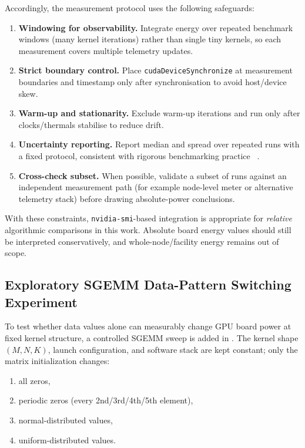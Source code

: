 Accordingly, the measurement protocol uses the following safeguards:
\begin{enumerate}
  \item \textbf{Windowing for observability.} Integrate energy over repeated
  benchmark windows (many kernel iterations) rather than single tiny kernels,
  so each measurement covers multiple telemetry updates.
  \item \textbf{Strict boundary control.} Place \texttt{cudaDeviceSynchronize}
  at measurement boundaries and timestamp only after synchronisation to avoid
  host/device skew.
  \item \textbf{Warm-up and stationarity.} Exclude warm-up iterations and run
  only after clocks/thermals stabilise to reduce drift.
  \item \textbf{Uncertainty reporting.} Report median and spread over repeated
  runs with a fixed protocol, consistent with rigorous benchmarking practice
  ~\cite{kalibera2013rigorous}.
  \item \textbf{Cross-check subset.} When possible, validate a subset of runs
  against an independent measurement path (for example node-level meter or
  alternative telemetry stack) before drawing absolute-power conclusions.
\end{enumerate}

With these constraints, \texttt{nvidia-smi}-based integration is appropriate
for \emph{relative} algorithmic comparisons in this work. Absolute board
energy values should still be interpreted conservatively, and whole-node/facility
energy remains out of scope.

\subsection{Exploratory SGEMM Data-Pattern Switching Experiment}\label{sec:energy-gemm-switching-todo}

To test whether data values alone can measurably change GPU board power at
fixed kernel structure, a controlled SGEMM sweep is added in
.
The kernel shape $(M,N,K)$, launch configuration, and software stack are
kept constant; only the matrix initialization changes:
\begin{enumerate}
  \item all zeros,
  \item periodic zeros (every 2nd/3rd/4th/5th element),
  \item normal-distributed values,
  \item uniform-distributed values.
\end{enumerate}


